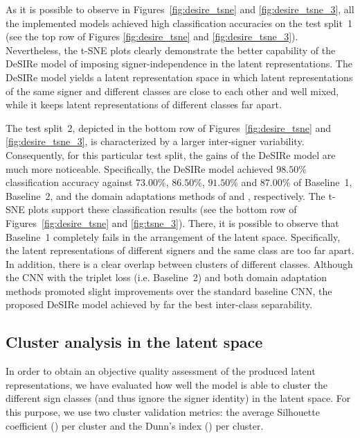 As it is possible to observe in Figures~\ref{fig:desire_tsne} and \ref{fig:desire_tsne_3}, all the implemented models achieved high classification accuracies on the test split~1 (see the top row of Figures \ref{fig:desire_tsne} and \ref{fig:desire_tsne_3}). Nevertheless, the t-SNE plots clearly demonstrate the better capability of the DeSIRe model of imposing signer-independence in the latent representations. The DeSIRe model yields a latent representation space in which latent representations of the same signer and different classes are close to each other and well mixed, while it keeps latent representations of different classes far apart.

The test split~2, depicted in the bottom row of Figures~\ref{fig:desire_tsne} and \ref{fig:desire_tsne_3}, is characterized by a larger inter-signer variability. Consequently, for this particular test split, the gains of the DeSIRe model are much more noticeable. Specifically, the DeSIRe model achieved $98.50\%$ classification accuracy against $73.00\%$, $86.50\%$, $91.50\%$ and $87.00\%$ of Baseline~1, Baseline~2, and the domain adaptations methods of \citet{Ganin2015} and \citet{Hu2016}, respectively. The t-SNE plots support these classification results (see the bottom row of Figures~\ref{fig:desire_tsne} and \ref{fig:tsne_3}). There, it is possible to observe that Baseline~1 completely fails in the arrangement of the latent space. Specifically, the latent representations of different signers and the same class are too far apart. In addition, there is a clear overlap between clusters of different classes. Although the CNN with the triplet loss (i.e. Baseline~2) and both domain adaptation methods promoted slight improvements over the standard baseline CNN, the proposed DeSIRe model achieved by far the best inter-class separability.

\subsection{Cluster analysis in the latent space}
\label{sec:desire_clusters}
In order to obtain an objective quality assessment of the produced latent representations, we have evaluated how well the model is able to cluster the different sign classes (and thus ignore the signer identity) in the latent space. For this purpose, we use two cluster validation metrics: the average Silhouette coefficient (\citet{Rousseeuw1987}) per cluster and the Dunn's index (\citet{Dunn1973}) per cluster.

